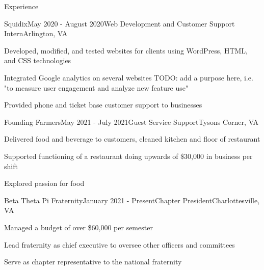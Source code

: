\documentclass{resume}
\begin{document}
\begin{rSection}{Experience}

    \begin{rSubsection}{Squidix}{May 2020 - August 2020}{Web Development and Customer Support Intern}{Arlington, VA}
        \item Developed, modified, and tested websites for clients using WordPress, HTML, and CSS technologies
        \item Integrated Google analytics on several websites {TODO: add a purpose here, i.e. "to measure user engagement and analyze new feature use"}
        \item Provided phone and ticket base customer support to businesses
    \end{rSubsection}

    \begin{rSubsection}{Founding Farmers}{May 2021 - July 2021}{Guest Service Support}{Tysons Corner, VA}
        \item Delivered food and beverage to customers, cleaned kitchen and floor of restaurant
        \item Supported functioning of a restaurant doing upwards of \$30,000 in business per shift
        \item Explored passion for food
    \end{rSubsection}


    \begin{rSubsection}{Beta Theta Pi Fraternity}{January 2021 - Present}{Chapter President}{Charlottesville, VA}
        \item Managed a budget of over \$60,000 per semester
        \item Lead fraternity as chief executive to oversee other officers and committees
        \item Serve as chapter representative to the national fraternity
    \end{rSubsection}


\end{rSection}

\end{document}
